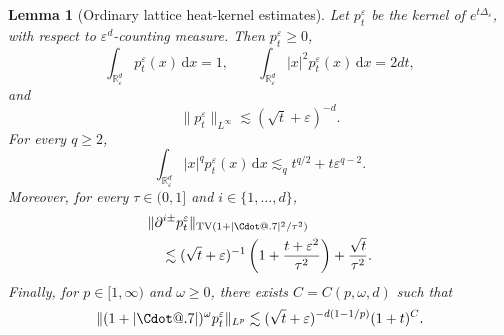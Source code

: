 \documentclass{article}
\makeatletter
\numberwithin{equation}{section}
\newcommand{\mathd}{\mathrm{d}}
\newcommand*\Cdot{{\mathpalette\Cdot@{.7}}}
\newcommand*\Cdot@[2]{\mathbin{\vcenter{\hbox{\scalebox{#2}{\hspace{0.1mm}$\m@th#1\bullet$\hspace{0.1mm}}}}}}
\theoremstyle{plain}
\newtheorem{lemma}[theorem]{Lemma}
\theoremstyle{definition}
\makeatother
\begin{document}
\begin{lemma}[Ordinary lattice heat-kernel estimates]
	\label{lem:sublattice-heat-kernel}
	Let \(p_t^\varepsilon\) be the kernel of
	\(e^{t\Delta_\varepsilon}\), with respect to
	\(\varepsilon^d\)-counting measure.  Then \(p_t^\varepsilon\geq0\),
	\[
	\int_{\mathbb R_\varepsilon^d}p_t^\varepsilon(x)\,\mathd x=1,
	\qquad
	\int_{\mathbb R_\varepsilon^d}|x|^2
	p_t^\varepsilon(x)\,\mathd x=2dt,
	\]
	and
	\begin{equation}
		\label{eq:sublattice-heat-Linfty}
		\|p_t^\varepsilon\|_{L^\infty}
		\lesssim(\sqrt t+\varepsilon)^{-d}.
	\end{equation}
	For every \(q\geq2\),
	\begin{equation}
		\label{eq:sublattice-heat-moments}
		\int_{\mathbb R_\varepsilon^d}|x|^q
		p_t^\varepsilon(x)\,\mathd x
		\lesssim_q t^{q/2}+t\varepsilon^{q-2}.
	\end{equation}
	Moreover, for every \(\tau\in(0,1]\) and
	\(i\in\{1,\ldots,d\}\),
	\begin{equation}
		\label{eq:sublattice-heat-gradient}
		\begin{aligned}
			&\|\partial^{i\pm}p_t^\varepsilon\|
			_{\operatorname{TV}(1+|\Cdot|^2/\tau^2)}
			\\
			&\quad\lesssim
			(\sqrt t+\varepsilon)^{-1}
			\left(1+\frac{t+\varepsilon^2}{\tau^2}\right)
			+\frac{\sqrt t}{\tau^2}.
		\end{aligned}
	\end{equation}
	Finally, for \(p\in[1,\infty)\) and \(\omega\geq0\), there exists
	\(C=C(p,\omega,d)\) such that
	\begin{equation}
		\label{eq:sublattice-heat-weighted-Lp}
		\|(1+|\Cdot|)^\omega p_t^\varepsilon\|_{L^p}
		\lesssim
		(\sqrt t+\varepsilon)^{-d(1-1/p)}(1+t)^C.
	\end{equation}
\end{lemma}
\end{document}
